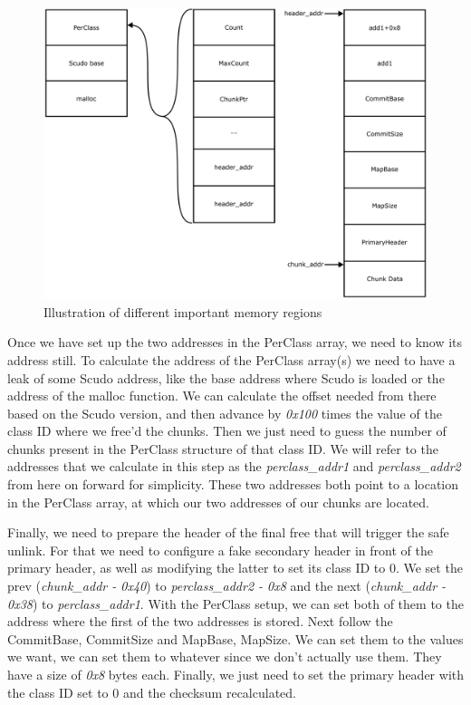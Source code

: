 \documentclass[a4paper,11pt,oneside]{report}
\begin{document}
\begin{figure}[h!]
  \centering
  \includegraphics[width=\linewidth]{figures/SafeUnlinkMemory.png}
  \caption{Illustration of different important memory regions}\label{fig:SafeUnlinkMemory}
\end{figure}

Once we have set up the two addresses in the PerClass array, we need to know its address
still. To calculate the address of the PerClass array(s) we need to have a leak of some
Scudo address, like the base address where Scudo is loaded or the address of the malloc
function. We can calculate the offset needed from there based on the Scudo version, and
then advance by \emph{0x100} times the value of the class ID where we free'd the
chunks. Then we just need to guess the number of chunks present in the PerClass structure
of that class ID. We will refer to the addresses that we calculate in this step as the
\emph{perclass\_addr1} and \emph{perclass\_addr2} from here on forward for simplicity. These
two addresses both point to a location in the PerClass array, at which our two addresses
of our chunks are located.

Finally, we need to prepare the header of the final free that will trigger the safe
unlink. For that we need to configure a fake secondary header in front of the primary
header, as well as modifying the latter to set its class ID to 0. We set the prev
(\emph{chunk\_addr - 0x40}) to \emph{perclass\_addr2 - 0x8} and the next
(\emph{chunk\_addr - 0x38}) to \emph{perclass\_addr1}. With the PerClass setup, we
can set both of them to the address where the first of the two addresses is stored.  Next
follow the CommitBase, CommitSize and MapBase, MapSize. We can set them to the values we
want, we can set them to whatever since we don't actually use them. They have a size of
\emph{0x8} bytes each.  Finally, we just need to set the primary header with the class ID
set to 0 and the checksum recalculated.
\end{document}
